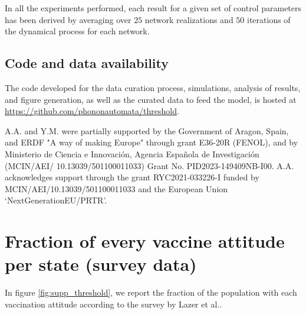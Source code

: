 \documentclass[
 reprint,
 amsmath,amssymb,
 aps,
]{revtex4-2}
\begin{document}
In all the experiments performed, each result for a given set of control parameters has been derived by averaging over $25$ network realizations and $50$ iterations of the dynamical process for each network.

\subsection{Code and data availability}
\label{subsec:code}

The code developed for the data curation process, simulations, analysis of results, and figure generation, as well as the curated data to feed the model, is hosted at \url{https://github.com/phononautomata/threshold}. 

\begin{acknowledgements}
A.A. and Y.M. were partially supported by the Government of Aragon, Spain, and ERDF "A way of making Europe" through grant E36-20R (FENOL), and by Ministerio de Ciencia e Innovación, Agencia Española de Investigaci\'on (MCIN/AEI/ 10.13039/501100011033) Grant No. PID2023-149409NB-I00. A.A. acknowledges support through the grant RYC2021-033226-I funded by MCIN/AEI/10.13039/501100011033 and the European Union ‘NextGenerationEU/PRTR’.
\end{acknowledgements}

\clearpage

\appendix
\renewcommand{\thefigure}{\Alph{section}\arabic{figure}}

\section{Fraction of every vaccine attitude per state (survey data)}
\label{app:attitudes}

\setcounter{figure}{0}


In figure \ref{fig:supp_threshold}, we report the fraction of the population with each vaccination attitude according to the survey by Lazer et al.\cite{lazer2021covid}. 
\end{document}
